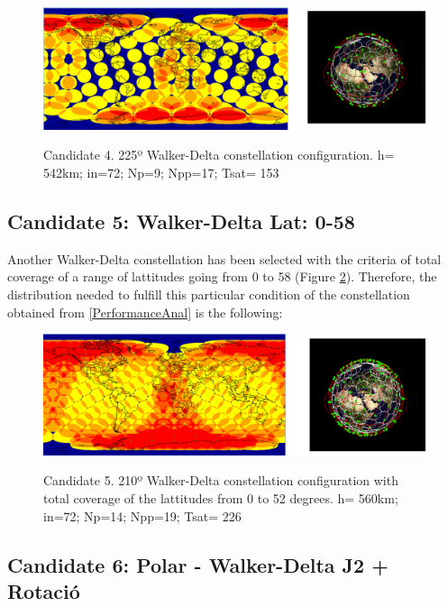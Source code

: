 \begin{figure}%
	\centering
	\includegraphics[width=1\textwidth]{Candidate4.png}\\
	\caption{Candidate 4. 225º Walker-Delta constellation configuration.
			 h= 542km; in=72; Np=9; Npp=17; Tsat= 153}
	\label{fig:Candidate4}
\end{figure}



\subsection{Candidate 5: Walker-Delta Lat: 0-58}

Another Walker-Delta constellation has been selected with the criteria of total coverage of a range of lattitudes going from 0 to 58 (Figure \ref{fig:Candidate5}). Therefore, the distribution needed to fulfill this particular condition of the constellation obtained from \ref{PerformanceAnal} is the following:

\begin{figure}%
	\centering
	\includegraphics[width=1\textwidth]{Candidate5.png}\\
	\caption{Candidate 5. 210º Walker-Delta constellation configuration with total coverage of the lattitudes from 0 to 52 degrees.
			 h= 560km; in=72; Np=14; Npp=19; Tsat= 226} 
	\label{fig:Candidate5}
\end{figure}


\subsection{Candidate 6: Polar - Walker-Delta J2 + Rotació}


